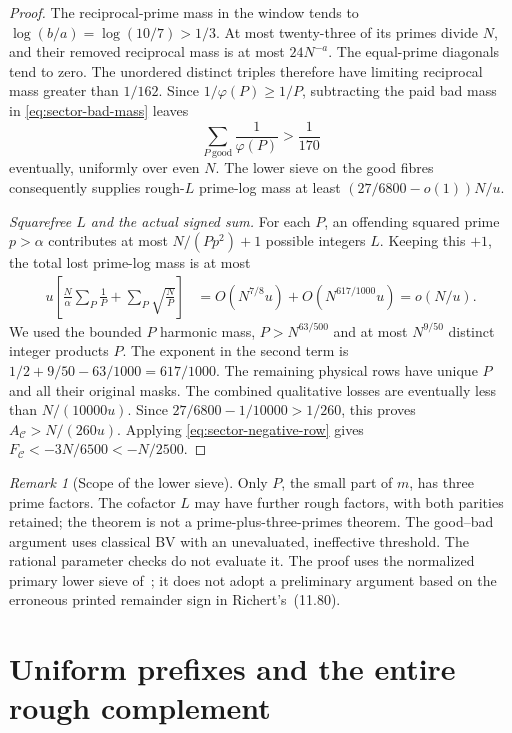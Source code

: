 \documentclass[11pt,a4paper]{article}
\theoremstyle{definition}
\theoremstyle{remark}
\newtheorem{remark}[theorem]{Remark}
\begin{document}
\begin{proof}
The reciprocal-prime mass in the window tends to
$\log(b/a)=\log(10/7)>1/3$.  At most twenty-three of its primes
divide $N$, and their removed reciprocal mass is at most $24N^{-a}$.
The equal-prime diagonals tend to zero.  The unordered distinct
triples therefore have limiting reciprocal mass greater than
$1/162$.  Since $1/\varphi(P)\geq1/P$, subtracting the paid bad
mass in \eqref{eq:sector-bad-mass} leaves
\begin{equation}
             \sum_{P\ \mathrm{good}}\frac1{\varphi(P)}>\frac1{170}
 \label{eq:sector-good-harmonic}
\end{equation}
eventually, uniformly over even $N$.  The lower sieve on the good
fibres consequently supplies rough-$L$ prime-log mass at least
$(27/6800-o(1))N/u$.

\emph{Squarefree $L$ and the actual signed sum.}
For each $P$, an offending squared prime $p>\alpha$ contributes
at most $N/(Pp^2)+1$ possible integers $L$.  Keeping this $+1$,
the total lost prime-log mass is at most
\begin{align}
 u\left[\frac N\alpha\sum_P\frac1P
                         +\sum_P\sqrt{\frac NP}\right]
 &=O(N^{7/8}u)+O(N^{617/1000}u)
 =o(N/u).
 \label{eq:sector-squarefree-L-loss}
\end{align}
We used the bounded $P$ harmonic mass, $P>N^{63/500}$ and at most
$N^{9/50}$ distinct integer products $P$.  The exponent in the
second term is $1/2+9/50-63/1000=617/1000$.  The remaining
physical rows have unique $P$ and all their original masks.
The combined qualitative losses are eventually less than
$N/(10000u)$.  Since
$27/6800-1/10000>1/260$, this proves
$A_{\mathcal C}>N/(260u)$.  Applying
\eqref{eq:sector-negative-row} gives
$F_{\mathcal C}<-3N/6500<-N/2500$.
\end{proof}

\begin{remark}[Scope of the lower sieve]
Only $P$, the small part of $m$, has three prime factors.  The
cofactor $L$ may have further rough factors, with both parities
retained; the theorem is not a prime-plus-three-primes theorem.
The good--bad argument uses classical BV with an unevaluated,
ineffective threshold.  The rational parameter checks do not
evaluate it.  The proof uses the normalized primary lower sieve
of~\cite{MTZ}; it does not adopt a preliminary argument based on
the erroneous printed remainder sign in Richert's~(11.80).
\end{remark}

\section{Uniform prefixes and the entire rough complement}
\label{sec:sector-eighth-rough}
\end{document}
